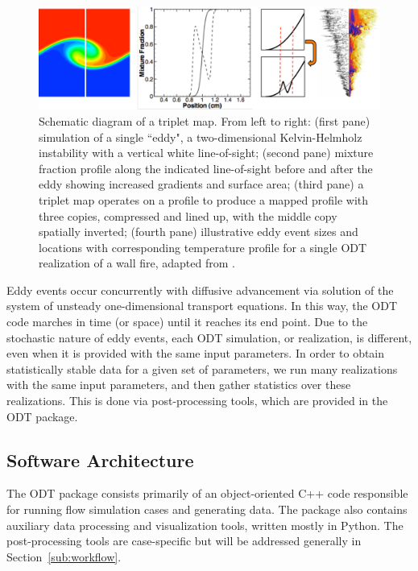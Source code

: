 \documentclass[preprint,12pt, a4paper]{elsarticle}
\begin{document}
\begin{figure}
	\centering
	\includegraphics[width=\textwidth]{../figures/tripletmap/tripmap.pdf} 
    \caption{Schematic diagram of a triplet map. From left to right: (first pane) simulation of a single ``eddy", a two-dimensional Kelvin-Helmholz instability with a vertical white line-of-sight; (second pane) mixture fraction profile along the indicated line-of-sight before and after the eddy showing increased gradients and surface area; (third pane) a triplet map operates on a profile to produce a mapped profile with three copies, compressed and lined up, with the middle copy spatially inverted; (fourth pane) illustrative eddy event sizes and locations with corresponding temperature profile for a single ODT realization of a wall fire, adapted from \cite{Monson_2016}.}
	\label{fig:tripletmap}
\end{figure}

Eddy events occur concurrently with diffusive advancement via solution of the system of unsteady one-dimensional transport equations. In this way, the ODT code marches in time (or space) until it reaches its end point. Due to the stochastic nature of eddy events, each ODT simulation, or realization, is different, even when it is provided with the same input parameters. In order to obtain statistically stable data for a given set of parameters, we run many realizations with the same input parameters, and then gather statistics over these realizations. This is done via post-processing tools, which are provided in the ODT package. 

\subsection{Software Architecture}
\label{sub:architecture}

The ODT package consists primarily of an object-oriented C++ code responsible for running flow simulation cases and generating data. The package also contains auxiliary data processing and visualization tools, written mostly in Python. The post-processing tools are case-specific but will be  addressed generally in Section~\ref{sub:workflow}. 
\end{document}
